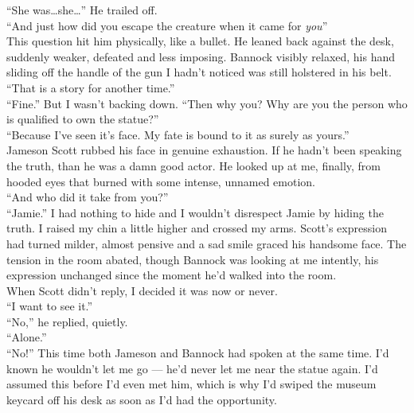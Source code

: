 \documentclass[a5paper]{scrartcl}
\begin{document}
\enquote{She was\dots she\dots } He trailed off.\\


\enquote{And just how did you escape the creature when it came for \textit{you}}\\


This question hit him physically,  like a bullet. He leaned back against the desk,  suddenly weaker, defeated and less imposing. Bannock visibly relaxed, his hand sliding off the handle of the gun I hadn't noticed was still holstered in his belt.\\


\enquote{That is a story for another time.}\\


\enquote{Fine.} But I wasn't backing down.  \enquote{Then why you? Why are you the person who is qualified to own the statue?}\\


\enquote{Because I've seen it's face. My fate is bound to it as surely as yours.}\\


Jameson Scott rubbed his face in genuine exhaustion. If he hadn't been speaking the truth, than he was a damn good actor. He looked up at me, finally, from hooded eyes that burned with some intense, unnamed emotion.\\


\enquote{And who did it take from you?}\\


\enquote{Jamie.} I had nothing to hide and I wouldn't disrespect Jamie by hiding the truth. I raised my chin a little higher and crossed my arms. Scott's expression had turned milder, almost pensive and a sad smile graced his handsome face. The tension in the room abated, though Bannock was looking at me intently, his expression unchanged since the moment he'd walked into the room. \\


When Scott didn't reply, I decided it was now or never.\\


\enquote{I want to see it.}\\


\enquote{No,} he replied, quietly.\\


\enquote{Alone.}\\


\enquote{No!} This time both Jameson and Bannock had spoken at the same time. I'd known he wouldn't let me go --- he'd never let me near the statue again. I'd assumed this before I'd even met him, which is why I'd swiped the museum keycard off his desk as soon as I'd had the opportunity.\\
\end{document}
